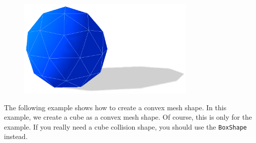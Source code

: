 \documentclass[a4paper,12pt]{article}
\begin{document}
    \begin{figure}[!ht]
        \centering
        \includegraphics{convexshape.png}
        \label{fig:convexshape}
    \end{figure}

    The following example shows how to create a convex mesh shape. In this example, we create a cube as a convex mesh shape. Of course, this is only
    for the example.  If you really need a cube collision shape, you should use the \texttt{BoxShape} instead. \\
\end{document}
